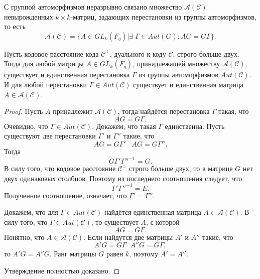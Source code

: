  С группой автоморфизмов неразрывно связано множество $\mathcal
A(\mathcal C)$ невырожденных $k\times k$-матриц, задающих
перестановки из группы автоморфизмов, то есть
$$
\mathcal A(\mathcal C)=\{A\in GL_k(F_q)|\exists\; \Gamma\in
Aut(G): AG=G\Gamma\}.
$$
\begin{proposition}
Пусть кодовое расстояние кода $\mathcal C^{\perp}$, дуального к
коду $\mathcal C$, строго больше двух. Тогда для любой матрицы
$A\in GL_k(F_q)$, принадлежащей множеству $\mathcal A(\mathcal
C)$, существует и единственная перестановка $\Gamma$ из группы
автоморфизмов $Aut(\mathcal C)$. И для любой перестановки
$\Gamma\in Aut(\mathcal C)$ существует и единственная матрица
$A\in\mathcal A(\mathcal C)$.
\end{proposition}
\begin{proof}
Пусть $A$ принадлежит $\mathcal A(\mathcal C)$, тогда найдётся
перестановка $\Gamma$ такая, что
$$
AG=G\Gamma.
$$
Очевидно, что $\Gamma\in Aut(\mathcal C)$. Докажем, что такая
$\Gamma$ единственна. Пусть существуют две перестановки $\Gamma'$
и $\Gamma''$ такие, что
$$
AG=G\Gamma'\;\;\;AG=G\Gamma''.
$$
Тогда
$$
G\Gamma'\Gamma''^{-1}=G.
$$
В силу того, что кодовое расстояние $\mathcal C^{\perp}$ строго
больше двух, то в матрице $G$ нет двух одинаковых столбцов.
Поэтому из последнего соотношения следует, что
$$
\Gamma'\Gamma''^{-1}=E.
$$
Полученное соотношение, означает, что $\Gamma'=\Gamma''$.

Докажем, что для $\Gamma\in Aut(\mathcal C)$ найдётся единственная
матрица $A\in \mathcal A(\mathcal C).$ В силу того, что $\Gamma\in
Aut(\mathcal C)$, то существует $A$, с которой
$$
AG=G\Gamma.
$$
Понятно, что $A\in\mathcal A(\mathcal C)$. Если найдутся две
матрицы $A'$ и $A''$ такие, что
$$
A'G=G\Gamma\;\;A''G=G\Gamma,
$$
то $A'G=A''G$. Ранг матрицы $G$ равен $k$, поэтому $A'=A''$.

Утверждение полностью доказано.
\end{proof}

